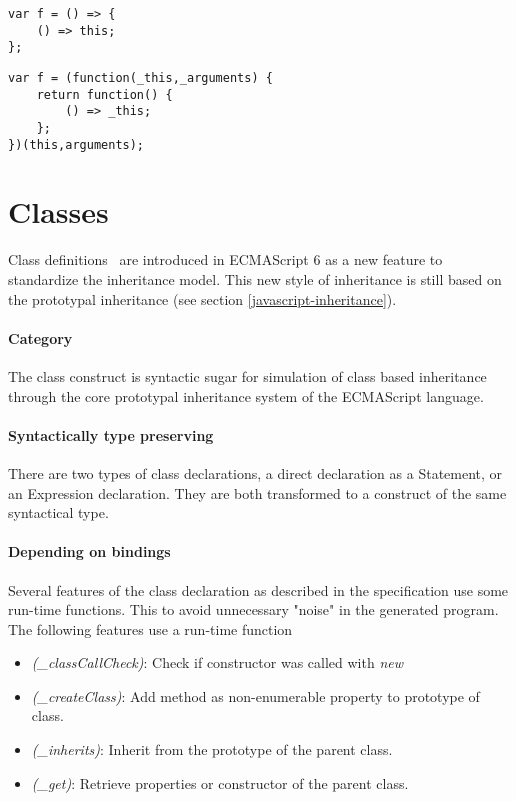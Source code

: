 \begin{lstlisting}
var f = () => {
	() => this;
};
\end{lstlisting}

\begin{lstlisting}[caption={Incorrect renaming of this in nested arrow function}]
var f = (function(_this,_arguments) {
	return function() {
		() => _this;
	};
})(this,arguments);
\end{lstlisting}

\section{Classes}
Class definitions~\cite[14.5]{SpecJS} are introduced in ECMAScript 6 as a new feature to standardize the inheritance model.
This new style of inheritance is still based on the prototypal inheritance (see section \ref{javascript-inheritance}).

\paragraph{Category}
The class construct is syntactic sugar for simulation of class based inheritance through the core prototypal inheritance system of the ECMAScript language.

\paragraph{Syntactically type preserving}
There are two types of class declarations, a direct declaration as a Statement, or an Expression declaration. They are both transformed to a construct of the same syntactical type.

\paragraph{Depending on bindings}
Several features of the class declaration as described in the specification use some run-time functions. This to avoid unnecessary "noise" in the generated program. The following features use a run-time function

\begin{itemize}
	\item \textit{(\_classCallCheck)}: Check if constructor was called with \textit{new}
	\item \textit{(\_createClass)}: Add method as non-enumerable property to prototype of class.
	\item \textit{(\_inherits)}: Inherit from the prototype of the parent class.
	\item \textit{(\_get)}: Retrieve properties or constructor of the parent class.
\end{itemize}

